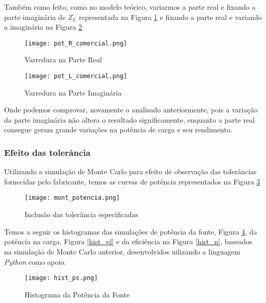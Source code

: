 \documentclass[a4paper,12pt]{proc}
\begin{document}
\singlespacing

\noindent Também como feito, como no modelo teórico, variarmos a parte real e fixando a parte imaginária de $Z_{L}$ representada na Figura \ref{R_comercial} e fixando a parte real e variando a imaginária na Figura \ref{L_comercial}

\singlespacing

\begin{figure}[htbp]
    \centering
    \texttt{[image: pot\_R\_comercial.png]}
    \caption{Varredura na Parte Real}
    \label{R_comercial}
\end{figure}

\begin{figure}[htbp]
    \centering
    \texttt{[image: pot\_L\_comercial.png]}
    \caption{Varredura na Parte Imaginária}
    \label{L_comercial}
\end{figure}

\noindent Onde podemos comprovar, novamente o analisado anteriormente, pois a variação da parte imaginária não altera o resultado significamente, enquanto a parte real consegue geram grande variações na potência de carga e seu rendimento. 

\subsubsection{Efeito das tolerância}

Utilizando a simulação de Monte Carlo para efeito de observação das tolerâncias fornecidas pelo fabricante, temos as curvas de potência representados na Figura \ref{mont_pot}

\begin{figure}[htbp]
    \centering
    \texttt{[image: mont\_potencia.png]}
    \caption{Inclusão das tolerância
    especificadas}
    \label{mont_pot}
\end{figure}

\singlespacing

\noindent Temos a seguir os histogramas das simulações de potência da fonte, Figura \ref{hist_ps}, da potência na carga, Figura \ref{hist_pl} e da eficiência na Figura \ref{hist_n}, baseados na simulação de Monte Carlo anterior, desenvolvidos uilizando a linguagem \textit{Python} como apoio.

\begin{figure}[htbp]
    \centering
    \texttt{[image: hist\_ps.png]}
    \caption{Histograma da Potência da Fonte}
    \label{hist_ps}
\end{figure}
\end{document}
